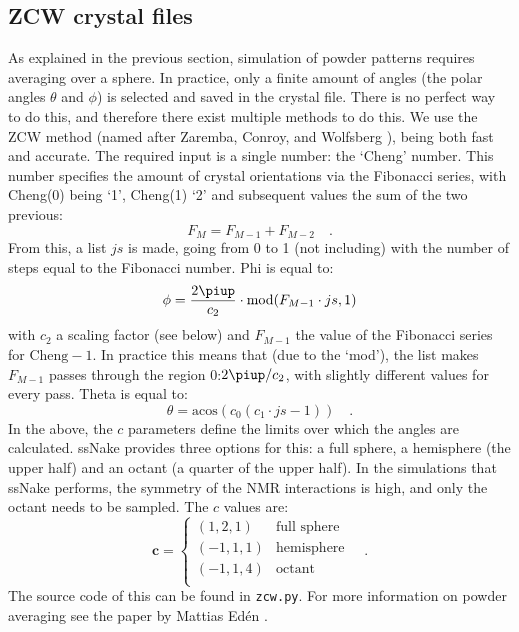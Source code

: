 \documentclass[11pt,a4paper]{article}
\begin{document}
\subsection*{ZCW crystal files}
As explained in the previous section, simulation of powder patterns requires averaging over a sphere. In practice, only a finite amount of angles (the polar angles $\theta$ and $\phi$) is selected and saved in the crystal file. There is no perfect way to do this, and therefore there exist multiple methods to do this. We use the ZCW method (named after Zaremba, Conroy, and Wolfsberg \cite{zaremba1966good,conroy1967molecular,cheng1973investigations}), being both fast and accurate. The required input is a single number: the `Cheng' number. This number specifies the amount of crystal orientations via the Fibonacci series, with Cheng(0) being `1', Cheng(1) `2' and subsequent values the sum of the two previous:
\begin{equation}
F_M = F_{M-1} + F_{M-2}	\quad .
\end{equation} 
From this, a list $js$ is made, going from 0 to 1 (not including) with the number of steps equal to the Fibonacci number. Phi is equal to:
\begin{equation}
\phi = \dfrac{2  \piup}{c_2} \cdot \text{mod}(F_{M-1} \cdot js, 1)
\end{equation} 
with $c_2$ a scaling factor (see below) and $F_{M-1}$ the value of the Fibonacci series for $\text{Cheng} - 1$. In practice this means that (due to the `mod'), the list makes $F_{M-1}$ passes through the region 0:$2  \piup/c_2$, with slightly different values for every pass. Theta is equal to:
\begin{equation}
\theta = \text{acos}(c_0 (c_1 \cdot js - 1)) \quad .
\end{equation}
In the above, the $c$ parameters define the limits over which the angles are calculated. ssNake provides three options for this: a full sphere, a hemisphere (the upper half) and an octant (a quarter of the upper half). In the simulations that ssNake performs, the symmetry of the NMR interactions is high, and only the octant needs to be sampled. The $c$ values are:
\begin{equation}
\mathbf{c} = \left\{
  \begin{array}{ll}
    (1, 2, 1) & \text{full sphere}\\
    (-1, 1, 1) &\text{hemisphere}\\
    (-1, 1, 4) &\text{octant}\\
  \end{array}
\right. \quad .
\end{equation}
The source code of this can be found in \texttt{zcw.py}. For more information on powder averaging see the paper by Mattias Ed\'{e}n \cite{eden2003computer}.
\end{document}
